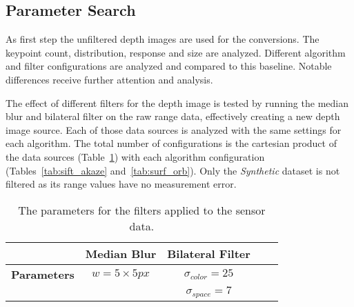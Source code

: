 \subsection{Parameter Search}

As first step the unfiltered depth images are used for the conversions.
The keypoint count, distribution, response and size are analyzed.
Different algorithm and filter configurations are analyzed and compared to this baseline.
Notable differences receive further attention and analysis.

The effect of different filters for the depth image is tested by running the median blur and bilateral filter on the raw range data, effectively creating a new depth image source.
Each of those data sources is analyzed with the same settings for each algorithm.
The total number of configurations is the cartesian product of the data sources (Table~\ref{tab:filter}) with each algorithm configuration (Tables~\ref{tab:sift_akaze} and~\ref{tab:surf_orb}).
Only the \emph{Synthetic} dataset is not filtered as its range values have no measurement error.
\begin{table}[H]
    {\renewcommand{\arraystretch}{1.3}%
    \setlength{\tabcolsep}{0.8em}%
    \footnotesize
    \begin{tabular}{ccccc}
    \toprule
    \null & \textbf{Median Blur} & \textbf{Bilateral Filter} \\
    \midrule
    \textbf{Parameters}
        & $w = 5 \times 5px$
        & $\sigma_{color} = 25$ \\
    \null & \null & $\sigma_{space} = 7$ \\
    \bottomrule
    \end{tabular}
    }
    \caption{The parameters for the filters applied to the sensor data.}\label{tab:filter}
\end{table}
